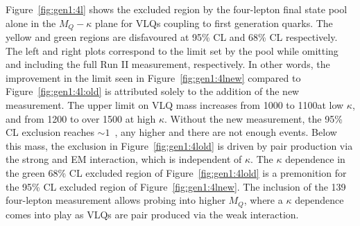 Figure~\ref{fig:gen1:4l} shows the \contur excluded region by the four-lepton final state pool alone in the $M_Q-\kappa$ plane for VLQs coupling to first generation quarks. The yellow and green regions are disfavoured at 95\% CL and 68\% CL respectively. The left and right plots correspond to the limit set by the pool while omitting and including the full Run II \mFourL{} measurement, respectively. In other words, the improvement in the limit seen in Figure~\ref{fig:gen1:4lnew} compared to Figure~\ref{fig:gen1:4l:old} is attributed solely to the addition of the new \mFourL{} measurement. The upper limit on VLQ mass increases from \unit{1000}{\GeV} to \unit{1100}{\GeV}at low $\kappa$, and from \unit{1200}{\GeV} to over \unit{1500}{\GeV} at high $\kappa$. Without the new \mFourL{} measurement, the 95\% CL exclusion reaches $\sim 1$~\TeV, any higher and there are not enough events. Below this mass, the exclusion in Figure~\ref{fig:gen1:4lold} is driven by pair production via the strong and EM interaction, which is independent of $\kappa$. The $\kappa$ dependence in the green 68\% CL excluded region of Figure~\ref{fig:gen1:4lold} is a premonition for the 95\% CL excluded region of Figure~\ref{fig:gen1:4lnew}. The inclusion of the \unit{139}{\fbinv} four-lepton measurement allows probing into higher $M_Q$, where a $\kappa$ dependence comes into play as VLQs are pair produced via the weak interaction. 

